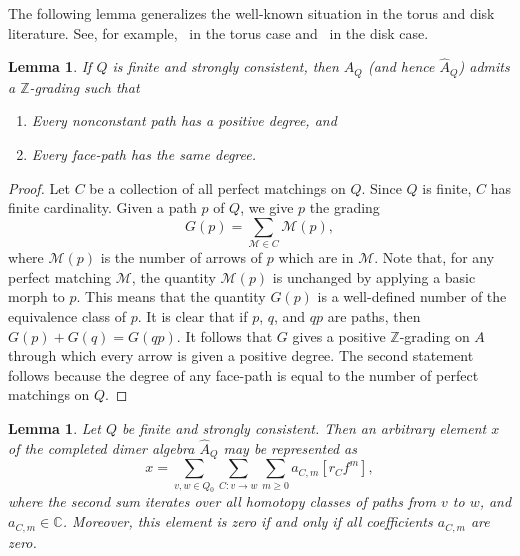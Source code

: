 \documentclass{article}
\newtheorem{lemma}[thm]{Lemma}
\theoremstyle{definition}
\begin{document}
The following lemma generalizes the well-known situation in the torus and disk literature. See, for example,~\cite[\S2.3]{XBroomhead2009} in the torus case and~\cite[Proposition 3.1]{XPressland2019} in the disk case.
\begin{lemma}\label{lem:posgrad}
	If $Q$ is {finite and} strongly consistent, then $A_Q$ (and hence $\widehat A_Q$) admits a $\mathbb Z$-grading such that
	\begin{enumerate}
		\item Every nonconstant path has a positive degree, and
		\item Every face-path has the same degree.
	\end{enumerate}
\end{lemma}
\begin{proof}
	Let $C$ be a collection of all perfect matchings on $Q$. Since $Q$ is finite, $C$ has finite cardinality. Given a path $p$ of $Q$, we give $p$ the grading
	\[G(p)=\sum_{\mathcal M\in C}\mathcal M(p),\]
	where $\mathcal M(p)$ is the number of arrows of $p$ which are in $\mathcal M$.
	Note that, for any perfect matching $\mathcal M$, the quantity $\mathcal M(p)$ is unchanged by applying a basic morph to $p$. This means that the quantity $G(p)$ is a well-defined number of the equivalence class of $p$. It is clear that if $p$, $q$, and $qp$ are paths, then $G(p)+G(q)=G(qp)$. It follows that $G$ gives a positive $\mathbb Z$-grading on $A$ through which every arrow is given a positive degree.
	The second statement follows because the degree of any face-path is equal to the number of perfect matchings on $Q$.
\end{proof}
\begin{lemma}\label{lem:mabel}
	Let $Q$ be finite and strongly consistent. Then an arbitrary element $x$ of the completed dimer algebra $\widehat A_Q$ may be represented as
	\[x=\sum_{v,w\in Q_0}\sum_{C:v\to w}\sum_{m\geq0}a_{C,m}[r_Cf^m],\]
	where the second sum iterates over all homotopy classes of paths from $v$ to $w$, and $a_{C,m}\in \mathbb{C}$. Moreover, this element is zero if and only if all coefficients $a_{C,m}$ are zero.
\end{lemma}
\end{document}
